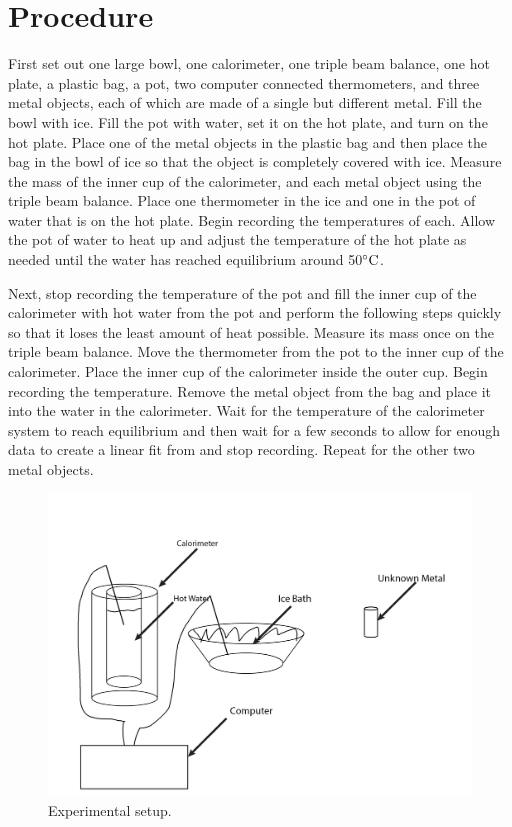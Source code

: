 \documentclass[12pt]{article}
\newcommand{\cel}{\mathrm{\degree C}}
\begin{document}
    \section{Procedure}
        First set out one large bowl, one calorimeter, one triple beam balance, one hot plate, a plastic bag, a pot, two computer connected thermometers, and three metal objects, each of which are made of a single but different metal. Fill the bowl with ice. Fill the pot with water, set it on the hot plate, and turn on the hot plate. Place one of the metal objects in the plastic bag and then place the bag in the bowl of ice so that the object is completely covered with ice. Measure the mass of the inner cup of the calorimeter, and each metal object using the triple beam balance. Place one thermometer in the ice and one in the pot of water that is on the hot plate. Begin recording the temperatures of each. Allow the pot of water to heat up and adjust the temperature of the hot plate as needed until the water has reached equilibrium around 50\(\cel\).

        Next, stop recording the temperature of the pot and fill the inner cup of the calorimeter with hot water from the pot and perform the following steps quickly so that it loses the least amount of heat possible. Measure its mass once on the triple beam balance. Move the thermometer from the pot to the inner cup of the calorimeter. Place the inner cup of the calorimeter inside the outer cup. Begin recording the temperature. Remove the metal object from the bag and place it into the water in the calorimeter. Wait for the temperature of the calorimeter system to reach equilibrium and then wait for a few seconds to allow for enough data to create a linear fit from and stop recording. Repeat for the other two metal objects.

        \begin{figure}[H]
            \centering
            \includegraphics[width=0.9\linewidth]{setup.png}
            \caption{Experimental setup.}
        \end{figure}
\end{document}
